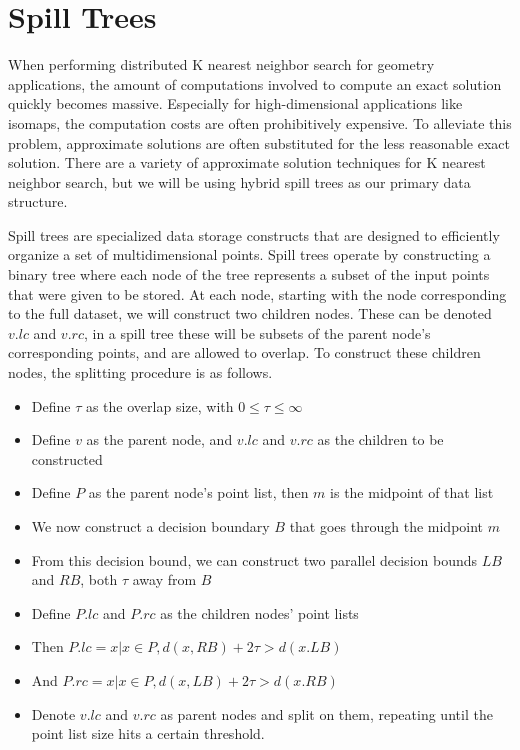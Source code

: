 \chapter{Spill Trees}

\vspace{5 mm}
\noindent
When performing distributed K nearest neighbor search for geometry applications, 
the amount of computations involved to compute an exact solution quickly 
becomes massive.  Especially for high-dimensional applications like isomaps, 
the computation costs are often prohibitively expensive.  To alleviate this 
problem, approximate solutions are often substituted for the less reasonable 
exact solution.  There are a variety of approximate solution techniques for K 
nearest neighbor search, but we will be using hybrid spill trees as our primary 
data structure. 

\vspace{5 mm}
\noindent
Spill trees are specialized data storage constructs that are designed to 
efficiently organize a set of multidimensional points.  Spill trees operate by 
constructing a binary tree where each node of the tree represents a subset of 
the input points that were given to be stored.  At each node, starting with the 
node corresponding to the full dataset, we will construct two children nodes. 
These can be denoted $v.lc$ and $v.rc$, in a spill tree these will be subsets of 
the parent node's corresponding points, and are allowed to overlap.  To 
construct these children nodes, the splitting procedure is as follows.

\begin{itemize}
  \item Define $\tau$ as the overlap size, with $0 \le \tau \le \infty$
  \item Define $v$ as the parent node, and $v.lc$ and $v.rc$ as the children to 
  be constructed
  \item Define $P$ as the parent node's point list, then $m$ is the midpoint of 
  that list
  \item We now construct a decision boundary $B$ that goes through the midpoint 
  $m$
  \item From this decision bound, we can construct two parallel decision bounds 
  $LB$ and $RB$, both $\tau$ away from $B$
  \item Define $P.lc$ and $P.rc$ as the children nodes' point lists
  \item Then $P.lc = {x|x \in P, d(x,RB) +2\tau > d(x.LB)}$
  \item And $P.rc = {x|x \in P, d(x,LB) +2\tau > d(x.RB)}$
  \item Denote $v.lc$ and $v.rc$ as parent nodes and split on them, repeating until 
  the point list size hits a certain threshold.
\end{itemize}

